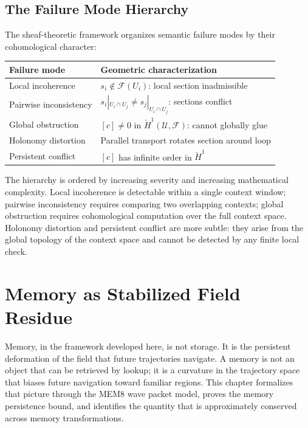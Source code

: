 \documentclass[12pt, oneside]{book}
\theoremstyle{flyxion}
\theoremstyle{definition}
\begin{document}
\section{The Failure Mode Hierarchy}

The sheaf-theoretic framework organizes semantic failure
modes by their cohomological character:

\begin{center}
\renewcommand{\arraystretch}{1.4}
\begin{tabular}{ll}
\toprule
Failure mode & Geometric characterization \\
\midrule
Local incoherence & $s_i \notin \mathcal{F}(U_i)$: local
  section inadmissible \\
Pairwise inconsistency & $s_i|_{U_i \cap U_j} \neq
  s_j|_{U_i \cap U_j}$: sections conflict \\
Global obstruction & $[c] \neq 0$ in $\check{H}^1
  (\mathcal{U}, \mathcal{F})$: cannot globally glue \\
Holonomy distortion & Parallel transport rotates
  section around loop \\
Persistent conflict & $[c]$ has infinite order in
  $\check{H}^1$ \\
\bottomrule
\end{tabular}
\end{center}

The hierarchy is ordered by increasing severity and
increasing mathematical complexity. Local incoherence
is detectable within a single context window; pairwise
inconsistency requires comparing two overlapping
contexts; global obstruction requires cohomological
computation over the full context space. Holonomy
distortion and persistent conflict are more subtle:
they arise from the global topology of the context
space and cannot be detected by any finite local check.

\chapter{Memory as Stabilized Field Residue}

Memory, in the framework developed here, is not storage.
It is the persistent deformation of the field that
future trajectories navigate. A memory is not an object
that can be retrieved by lookup; it is a curvature in
the trajectory space that biases future navigation
toward familiar regions. This chapter formalizes that
picture through the MEM\textbar{}8 wave packet model,
proves the memory persistence bound, and identifies the
quantity that is approximately conserved across memory
transformations.
\end{document}
